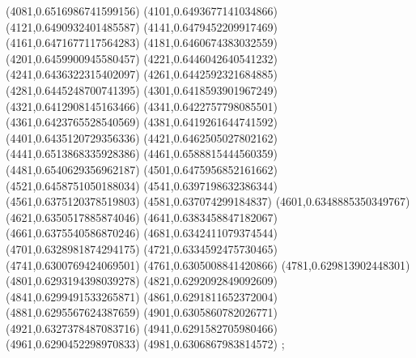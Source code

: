 {(4081,0.6516986741599156)
(4101,0.6493677141034866)
(4121,0.6490932401485587)
(4141,0.6479452209917469)
(4161,0.6471677117564283)
(4181,0.6460674383032559)
(4201,0.6459900945580457)
(4221,0.6446042640541232)
(4241,0.6436322315402097)
(4261,0.6442592321684885)
(4281,0.6445248700741395)
(4301,0.6418593901967249)
(4321,0.6412908145163466)
(4341,0.6422757798085501)
(4361,0.6423765528540569)
(4381,0.6419261644741592)
(4401,0.6435120729356336)
(4421,0.6462505027802162)
(4441,0.6513868335928386)
(4461,0.6588815444560359)
(4481,0.6540629356962187)
(4501,0.6475956852161662)
(4521,0.6458751050188034)
(4541,0.6397198632386344)
(4561,0.6375120378519803)
(4581,0.637074299184837)
(4601,0.6348885350349767)
(4621,0.6350517885874046)
(4641,0.6383458847182067)
(4661,0.6375540586870246)
(4681,0.6342411079374544)
(4701,0.6328981874294175)
(4721,0.6334592475730465)
(4741,0.6300769424069501)
(4761,0.6305008841420866)
(4781,0.629813902448301)
(4801,0.6293194398039278)
(4821,0.6292092849092609)
(4841,0.6299491533265871)
(4861,0.6291811652372004)
(4881,0.6295567624387659)
(4901,0.6305860782026771)
(4921,0.6327378487083716)
(4941,0.6291582705980466)
(4961,0.6290452298970833)
(4981,0.6306867983814572)
};
